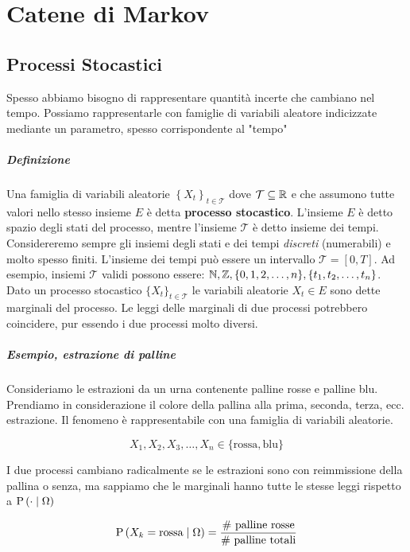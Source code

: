 \chapter{Catene di Markov}

\section{Processi Stocastici}
Spesso abbiamo bisogno di rappresentare quantità incerte che cambiano nel tempo. Possiamo rappresentarle con famiglie di variabili aleatore indicizzate mediante un parametro, spesso corrispondente al "tempo"

\paragraph{Definizione}
Una famiglia di variabili aleatorie $ \left\{X_t\right\}_{t\in \mathcal{T}} $ dove $ \mathcal{T} \subseteq \mathbb{R} $ e che assumono tutte valori nello stesso insieme $ E $ è detta \textbf{processo stocastico}. L'insieme $ E $ è detto spazio degli stati del processo, mentre l'insieme $ \mathcal{T} $ è detto insieme dei tempi. Considereremo sempre gli insiemi degli stati e dei tempi \textit{discreti} (numerabili) e molto spesso finiti. L'insieme dei tempi può essere un intervallo $ \mathcal{T} = [0,T] $. Ad esempio, insiemi $ \mathcal{T} $ validi possono essere: $ \mathbb{N}, \mathbb{Z}, \{0, 1, 2, \hdots, n\}, \{t_1, t_2, \hdots, t_n\} $. Dato un processo stocastico $ \{X_t\}_{t \in \mathcal{T}} $ le variabili aleatorie $ X_t \in E $ sono dette marginali del processo. Le leggi delle marginali di due processi potrebbero coincidere, pur essendo i due processi molto diversi.

\paragraph{Esempio, estrazione di palline}
Consideriamo le estrazioni da un urna contenente palline rosse e palline blu. Prendiamo in considerazione il colore della pallina alla prima, seconda, terza, ecc. estrazione. Il fenomeno è rappresentabile con una famiglia di variabili aleatorie.

\[ X_1, X_2, X_3, \hdots, X_n \in \{\text{rossa}, \text{blu}\} \]

I due processi cambiano radicalmente se le estrazioni sono con reimmissione della pallina o senza, ma sappiamo che le marginali hanno tutte le stesse leggi rispetto a $ \text{P}\left(\cdot \mid \Omega\right) $

\[ \text{P}\left(X_k = \text{rossa} \mid \Omega\right) = \dfrac{\text{\# palline rosse}}{\text{\# palline totali}} \]

